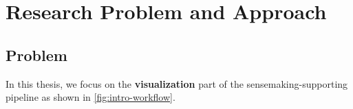 \section{Research Problem and Approach}

\subsection{Problem}
In this thesis, we focus on the \textbf{visualization} part of the sensemaking-supporting pipeline as shown in \autoref{fig:intro-workflow}.
\begin{center}
\end{center}





